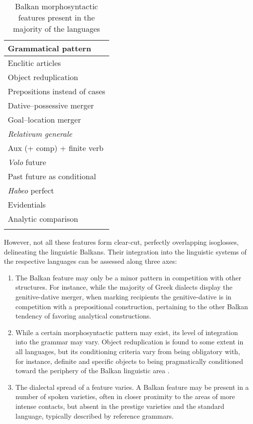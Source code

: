 \documentclass[output=paper]{langscibook}
\begin{document}
\begin{table}
\caption{Balkan morphosyntactic features present in the majority of the languages \parencite[adapted from][]{lindstedt00}}  
\label{tab-balkans}
 \begin{tabular}{p{9cm}} 
  \lsptoprule
  Grammatical pattern\\ 
  \midrule
Enclitic articles \\
Object reduplication \\
Prepositions instead of cases \\
Dative--possessive merger \\
Goal--location merger \\
\textit{Relativum generale} \\
Aux (+ comp) + finite verb \\
\textit{Volo} future \\
Past future as conditional \\
\textit{Habeo} perfect \\
Evidentials \\
Analytic comparison \\
  \lspbottomrule
 \end{tabular}
\end{table}

However, not all these features form clear-cut, perfectly overlapping isoglosses, delineating the linguistic Balkans. Their integration into the linguistic systems of the respective languages can be assessed along three axes:

\begin{enumerate}
\item The Balkan feature may only be a minor pattern in competition with other structures. For instance, while the majority of Greek dialects display the genitive-dative merger, when marking recipients the genitive-dative is in competition with a prepositional construction, pertaining to the other Balkan tendency of favoring analytical constructions.
\item While a certain morphosyntactic pattern may exist, its level of integration into the grammar may vary. Object reduplication is found to some extent in all languages, but its conditioning criteria vary from being obligatory with, for instance, definite and specific objects to being pragmatically conditioned toward the periphery of the Balkan linguistic area \parencite{friedman2008}.
\item The dialectal spread of a feature varies. A Balkan feature may be present in a number of spoken varieties, often in closer proximity to the areas of more intense contacts, but absent in the prestige varieties and the standard language, typically described by reference grammars.
\end{enumerate}
\end{document}
